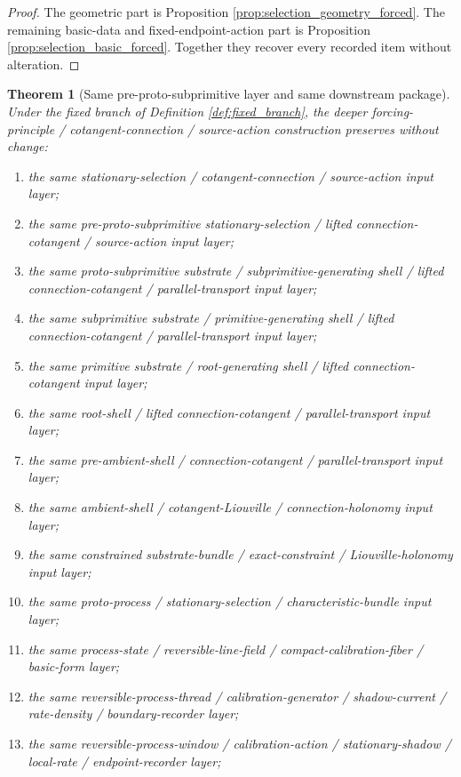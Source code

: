 \documentclass[11pt]{article}
\newtheorem{theorem}{Theorem}
\begin{document}
\begin{proof}
The geometric part is Proposition \ref{prop:selection_geometry_forced}. The remaining basic-data and fixed-endpoint-action part is Proposition \ref{prop:selection_basic_forced}. Together they recover every recorded item without alteration.
\end{proof}

\begin{theorem}[Same pre-proto-subprimitive layer and same downstream package]
\label{thm:same_package}
Under the fixed branch of Definition \ref{def:fixed_branch}, the deeper forcing-principle / cotangent-connection / source-action construction preserves without change:
\begin{enumerate}
    \item the same stationary-selection / cotangent-connection / source-action input layer;
    \item the same pre-proto-subprimitive stationary-selection / lifted connection-cotangent / source-action input layer;
    \item the same proto-subprimitive substrate / subprimitive-generating shell / lifted connection-cotangent / parallel-transport input layer;
    \item the same subprimitive substrate / primitive-generating shell / lifted connection-cotangent / parallel-transport input layer;
    \item the same primitive substrate / root-generating shell / lifted connection-cotangent input layer;
    \item the same root-shell / lifted connection-cotangent / parallel-transport input layer;
    \item the same pre-ambient-shell / connection-cotangent / parallel-transport input layer;
    \item the same ambient-shell / cotangent-Liouville / connection-holonomy input layer;
    \item the same constrained substrate-bundle / exact-constraint / Liouville-holonomy input layer;
    \item the same proto-process / stationary-selection / characteristic-bundle input layer;
    \item the same process-state / reversible-line-field / compact-calibration-fiber / basic-form layer;
    \item the same reversible-process-thread / calibration-generator / shadow-current / rate-density / boundary-recorder layer;
    \item the same reversible-process-window / calibration-action / stationary-shadow / local-rate / endpoint-recorder layer;

\end{enumerate}
\end{theorem}
\end{document}
